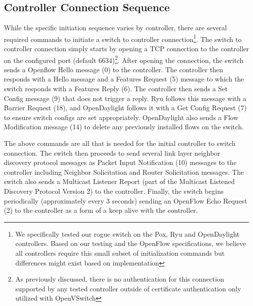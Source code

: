 \subsection {Controller Connection Sequence}
While the specific initiation sequence varies by controller, there are several required commands to initiate a switch to controller connection\footnote{We specifically tested our rogue switch on the Pox, Ryu and OpenDaylight controllers. Based on our testing and the OpenFlow specifications, we believe all controllers require this small subset of initialization commands but differences might exist based on implementation}. The switch to controller connection simply starts by opening a TCP connection to the controller on the configured port (default 6634)\footnote{As previously discussed, there is no authentication for this connection supported by any tested controller outside of certificate authentication only utilized with OpenVSwitch}.  After opening the connection, the switch sends a Openflow Hello message (0) to the controller. The controller then responds with a Hello message and a Features Request (5) message to which the switch responds with a  Features Reply (6). The controller then sends a Set Config message (9) that does not trigger a reply. Ryu follows this message with a Barrier Request (18), and OpenDaylight follows it with a  Get Config Request (7) to ensure switch configs are set appropriately. OpenDaylight also sends a Flow Modification message (14) to delete any previously installed flows on the switch.


The above commands are all that is needed for the initial controller to switch connection. The switch then proceeds to send several link layer neighbor discovery protocol messages as Packet Input Notification (10) messages to the controller including  Neighbor Solicitation and Router Solicitation messages. The switch also sends a Multicast Listener Report (part of the Multicast Listened Discovery Protocol Version 2) to the controller. Finally, the switch begins periodically (approximately every 3 seconds) sending an OpenFlow Echo Request (2) to the controller as a form of a keep alive with the controller.

